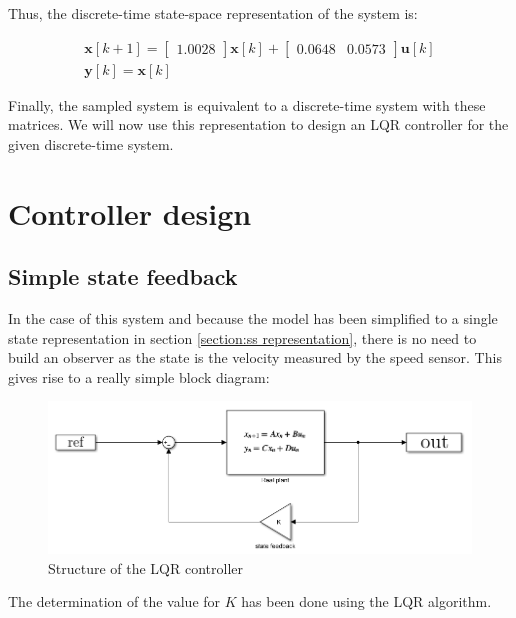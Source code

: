 Thus, the discrete-time state-space representation of the system is:

\begin{gather*}
    \mathbf{x}[k+1] = 
        \begin{bmatrix} 1.0028 \end{bmatrix} \mathbf{x}[k] 
    + \begin{bmatrix} 0.0648 & 0.0573 \end{bmatrix} \mathbf{u}[k]\\
    \mathbf{y}[k] = \mathbf{x}[k]
\end{gather*}


Finally, the sampled system is equivalent to a discrete-time system with these matrices. We will now use this representation to design an LQR controller for the given discrete-time system.

\section{Controller design}

\subsection{Simple state feedback}

In the case of this system and because the model has been simplified to a single state representation in section
\ref{section:ss representation}, there is no need to build an observer as the state is the velocity measured by the 
speed sensor. This gives rise to a really simple block diagram:

\begin{figure}[H]
    \centering
    \includegraphics[width = \textwidth]{Pictures/lqr_controller.png}
    \caption{Structure of the LQR controller}
    \label{fig:lqr structure}
\end{figure}

The determination of the value for $K$ has been done using the LQR algorithm.

